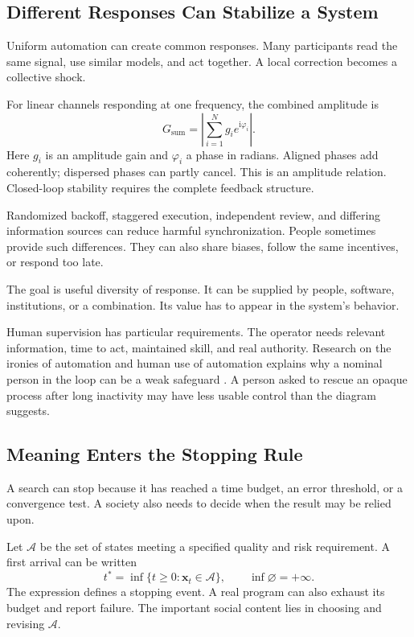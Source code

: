 \documentclass[11pt,openany]{book}
\begin{document}
\subsection{Different Responses Can Stabilize a System}

Uniform automation can create common responses. Many participants read the same signal, use similar models, and act together. A local correction becomes a collective shock.

For linear channels responding at one frequency, the combined amplitude is
\begin{equation}
 G_{\mathrm{sum}}=
 \left|\sum_{i=1}^{N}g_i e^{\mathrm{i}\varphi_i}\right|.
\end{equation}
Here $g_i$ is an amplitude gain and $\varphi_i$ a phase in radians. Aligned phases add coherently; dispersed phases can partly cancel. This is an amplitude relation. Closed-loop stability requires the complete feedback structure.

Randomized backoff, staggered execution, independent review, and differing information sources can reduce harmful synchronization. People sometimes provide such differences. They can also share biases, follow the same incentives, or respond too late.

The goal is useful diversity of response. It can be supplied by people, software, institutions, or a combination. Its value has to appear in the system's behavior.

Human supervision has particular requirements. The operator needs relevant information, time to act, maintained skill, and real authority. Research on the ironies of automation and human use of automation explains why a nominal person in the loop can be a weak safeguard \cite{bainbridge1983ironies,parasuraman1997humans}. A person asked to rescue an opaque process after long inactivity may have less usable control than the diagram suggests.

\subsection{Meaning Enters the Stopping Rule}

A search can stop because it has reached a time budget, an error threshold, or a convergence test. A society also needs to decide when the result may be relied upon.

Let $\mathcal A$ be the set of states meeting a specified quality and risk requirement. A first arrival can be written
\begin{equation}
 t^\ast=\inf\{t\geq0:\mathbf{x}_t\in\mathcal A\},
 \qquad \inf\varnothing=+\infty.
\end{equation}
The expression defines a stopping event. A real program can also exhaust its budget and report failure. The important social content lies in choosing and revising $\mathcal A$.
\end{document}
